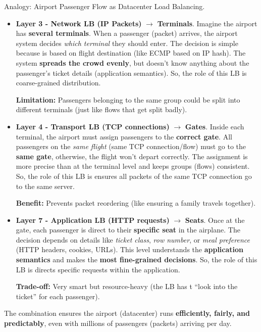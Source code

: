 \highspace
\begin{examplebox}
    Analogy: Airport Passenger Flow as Datacenter Load Balancing.
    \begin{itemize}
        \item \textbf{Layer 3 - Network LB (IP Packets)} $\rightarrow$ \textbf{Terminals}. Imagine the airport has \textbf{several terminals}. When a passenger (packet) arrives, the airport system decides \emph{which terminal} they should enter. The decision is simple because is based on flight destination (like ECMP based on IP hash). The system \textbf{spreads the crowd evenly}, but doesn't know anything about the passenger's ticket details (application semantics). So, the role of this LB is coarse-grained distribution.

        \textcolor{Red2}{ \textbf{Limitation:}} Passengers belonging to the same group could be split into different terminals (just like flows that get split badly).


        \item \textbf{Layer 4 - Transport LB (TCP connections)} $\rightarrow$ \textbf{Gates}. Inside each terminal, the airport must assign passengers to the \textbf{correct gate}. All passengers on the \emph{same flight} (same TCP connection/flow) must go to the \textbf{same gate}, otherwise, the flight won't depart correctly. The assignment is more precise than at the terminal level and keeps groups (flows) consistent. So, the role of this LB is ensures all packets of the same TCP connection go to the same server.
        
        \textcolor{Green3}{ \textbf{Benefit:}} Prevents packet reordering (like ensuring a family travels together).


        \item \textbf{Layer 7 - Application LB (HTTP requests)} $\rightarrow$ \textbf{Seats}. Once at the gate, each passenger is direct to their \textbf{specific seat} in the airplane. The decision depends on details like \emph{ticket class}, \emph{row number}, or \emph{meal preference} (HTTP headers, cookies, URLs). This level understands the \textbf{application semantics} and makes the \textbf{most fine-grained decisions}. So, the role of this LB is directs specific requests within the application.
        
        \textcolor{Red2}{ \textbf{Trade-off:}} Very smart but resource-heavy (the LB has t ``look into the ticket'' for each passenger).
    \end{itemize}
    The combination ensures the airport (datacenter) runs \textbf{efficiently, fairly, and predictably}, even with millions of passengers (packets) arriving per day.
\end{examplebox}